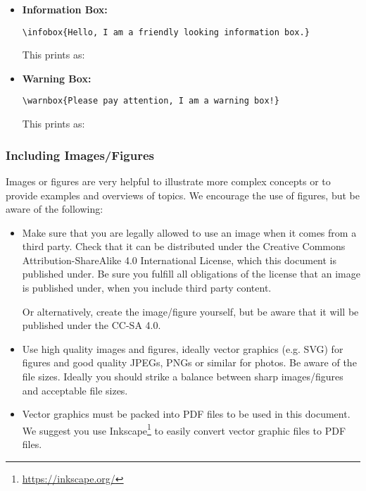 \begin{itemize}

\item \textbf{Information Box:}
\begin{lstlisting}[style=LaTeXStyle]
\infobox{Hello, I am a friendly looking information box.}
\end{lstlisting}
This prints as:

\item \textbf{Warning Box:}
\begin{lstlisting}[style=LaTeXStyle]
\warnbox{Please pay attention, I am a warning box!}
\end{lstlisting}
This prints as:

\end{itemize}

\subsubsection{Including Images/Figures}

Images or figures are very helpful to illustrate more complex concepts or to provide examples and overviews of topics.
We encourage the use of figures, but be aware of the following:
\begin{itemize}
\item 
Make sure that you are legally allowed to use an image when it comes from a third party.
Check that it can be distributed under the Creative Commons Attribution-ShareAlike 4.0 International License, which this document is published under.
Be sure you fulfill all obligations of the license that an image is published under, when you include third party content.

Or alternatively, create the image/figure yourself, but be aware that it will be published under the CC-SA 4.0.

\item
Use high quality images and figures, ideally vector graphics (e.g. SVG) for figures and good quality JPEGs, PNGs or similar for photos.
Be aware of the file sizes.
Ideally you should strike a balance between sharp images/figures and acceptable file sizes.

\item
Vector graphics must be packed into PDF files to be used in this document.
We suggest you use Inkscape\footnote{\url{https://inkscape.org/}} to easily convert vector graphic files to PDF files.
\end{itemize}

